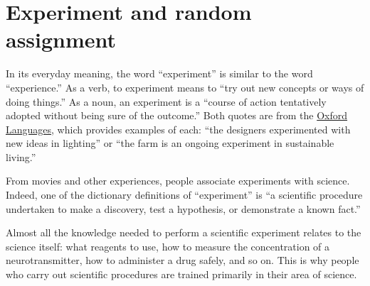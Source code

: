 \documentclass[
  letterpaper,
  DIV=11,
  numbers=noendperiod,
  oneside]{scrartcl}
\begin{document}
\newpage

\section{Experiment and random assignment}\label{sec-experiment}

In its everyday meaning, the word ``experiment'' is similar to the word
``experience.'' As a verb, to experiment means to ``try out new concepts
or ways of doing things.'' As a noun, an experiment is a ``course of
action tentatively adopted without being sure of the outcome.'' Both
quotes are from the
\href{https://languages.oup.com/google-dictionary-en/}{Oxford
Languages}, which provides examples of each: ``the designers
experimented with new ideas in lighting'' or ``the farm is an ongoing
experiment in sustainable living.''

From movies and other experiences, people associate experiments with
science. Indeed, one of the dictionary definitions of ``experiment'' is
``a scientific procedure undertaken to make a discovery, test a
hypothesis, or demonstrate a known fact.''

Almost all the knowledge needed to perform a scientific experiment
relates to the science itself: what reagents to use, how to measure the
concentration of a neurotransmitter, how to administer a drug safely,
and so on. This is why people who carry out scientific procedures are
trained primarily in their area of science.
\end{document}
